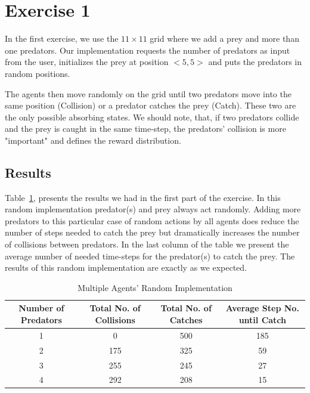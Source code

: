 \documentclass[a4paper,11pt]{article}
\begin{document}
\section{Exercise 1}

In the first exercise, we use the $11 \times 11$ grid where we add a prey and more than one predators. Our implementation requests the number of predators as input from the user, initializes the prey at position $<5,5>$ and puts the predators in random positions. 

The agents then move randomly on the grid until two predators move into the same position (Collision) or a predator catches the prey (Catch). These two are the only possible absorbing states. We should note, that, if two predators collide and the prey is caught in the same time-step, the predators' collision is more "important" and defines the reward distribution.


\subsection{Results}
Table~\ref{table:multirandom}, presents the results we had in the first part of the exercise. In this random implementation predator(s) and prey always act randomly. Adding more predators to this particular case of random actions by all agents does reduce the number of steps needed to catch the prey but dramatically increases the number of collisions between predators. In the last column of the table we present the average number of needed time-steps for the predator(s) to catch the prey. The results of this random implementation are exactly as we expected.
\begin{table}[h]
\begin{center}
\caption{Multiple Agents' Random Implementation}
\begin{tabular}{c c c c} 
\hline\hline               
\textbf{\small{Number of Predators}} & \textbf{\small{Total No. of Collisions}} & \textbf{\small{Total No. of Catches}} & \textbf{\small{Average Step No. until Catch}} \\  
\hline
1 & 0 & 500 & 185\\ 
2 & 175 & 325  & 59\\
3 & 255 & 245   & 27\\
4 & 292 & 208 & 15 \\ 
\end{tabular}
\label{table:multirandom} 
\end{center} 
\end{table} 
\end{document}
